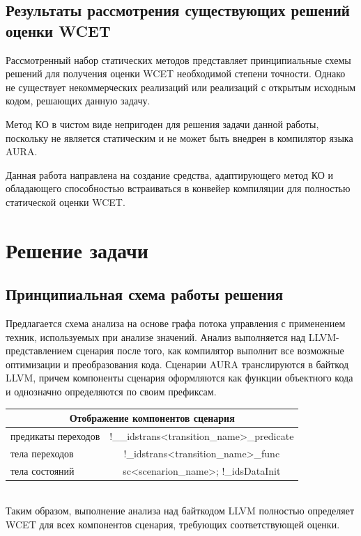 \documentclass[12pt,a4paper]{article}
\begin{document}
\subsection{Результаты рассмотрения существующих решений оценки WCET}

Рассмотренный набор статических методов представляет принципиальные схемы решений для получения оценки WCET необходимой степени точности. Однако не существует некоммерческих реализаций или реализаций с открытым исходным кодом, решающих данную задачу.

Метод КО в чистом виде непригоден для решения задачи данной работы, поскольку не является статическим и не может быть внедрен в компилятор языка AURA.

Данная работа направлена на создание средства, адаптирующего метод КО и обладающего способностью встраиваться в конвейер компиляции для полностью статической оценки WCET.

\newpage
\section{Решение задачи}

\subsection{Принципиальная схема работы решения}
Предлагается схема анализа на основе графа потока управления с применением техник, используемых при анализе значений. Анализ выполняется над LLVM-представлением сценария после того, как компилятор выполнит все возможные оптимизации и преобразования кода. Сценарии AURA транслируются в байткод LLVM, причем компоненты сценария оформляются как функции объектного кода и однозначно определяются по своим префиксам. \\[6mm]

\begin{tabular}{|l|c|}
\hline
\multicolumn{2}{|c|}{Отображение компонентов сценария} \\
\hline
предикаты переходов & !\_\_idstrans<transition\_name>\_predicate  \\
\hline
тела переходов & !\_idstrans<transition\_name>\_func \\
\hline
тела состояний & sc<scenarion\_name>; !\_idsDataInit \\
\hline
\end{tabular}
\\[6mm]

Таким образом, выполнение анализа над байткодом LLVM полностью определяет WCET для всех компонентов сценария, требующих соответствующей оценки.
\end{document}
